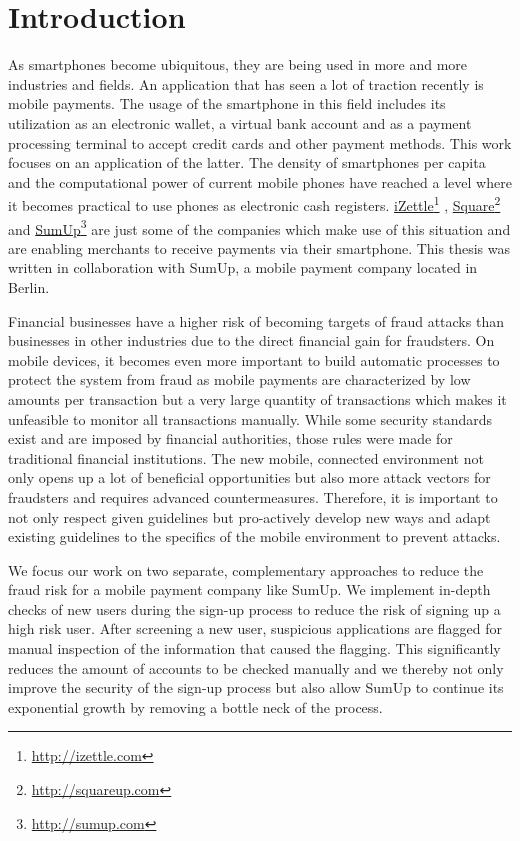 \documentclass[a4paper, oneside]{csthesis}
\newcommand\fnurl[2]{%
  \href{#2}{#1}\footnote{\url{#2}}%
}
\begin{document}
\tableofcontents

\mainmatter %



\chapter{Introduction}

As smartphones become ubiquitous, they are being used in more and more industries and fields. An application that has seen a lot of traction recently is mobile payments. The usage of the smartphone in this field includes its utilization as an electronic wallet, a virtual bank account and as a payment processing terminal to accept credit cards and other payment methods.
This work focuses on an application of the latter.
The density of smartphones per capita and the computational power of current mobile phones have reached a level where it becomes practical to use phones as electronic cash registers.
\fnurl{iZettle}{http://izettle.com}, \fnurl{Square}{http://squareup.com} and \fnurl{SumUp}{http://sumup.com} are just some of the companies which make use of this situation and are enabling merchants to receive payments via their smartphone. This thesis was written in collaboration with SumUp, a mobile payment company located in Berlin.

Financial businesses have a higher risk of becoming targets of fraud attacks than businesses in other industries due to the direct financial gain for fraudsters. On mobile devices, it becomes even more important to build automatic processes to protect the system from fraud as mobile payments are characterized by low amounts per transaction but a very large quantity of transactions which makes it unfeasible to monitor all transactions manually. While some security standards exist and are imposed by financial authorities, those rules were made for traditional financial institutions. The new mobile, connected environment not only opens up a lot of beneficial opportunities but also more attack vectors for fraudsters and requires advanced countermeasures. Therefore, it is important to not only respect given guidelines but pro-actively develop new ways and adapt existing guidelines to the specifics of the mobile environment to prevent attacks.

We focus our work on two separate, complementary approaches to reduce the fraud risk for a mobile payment company like SumUp.
We implement in-depth checks of new users during the sign-up process to reduce the risk of signing up a high risk user. After screening a new user, suspicious applications are flagged for manual inspection of the information that caused the flagging. This significantly reduces the amount of accounts to be checked manually and we thereby not only improve the security of the sign-up process but also allow SumUp to continue its exponential growth by removing a bottle neck of the process.
\end{document}
